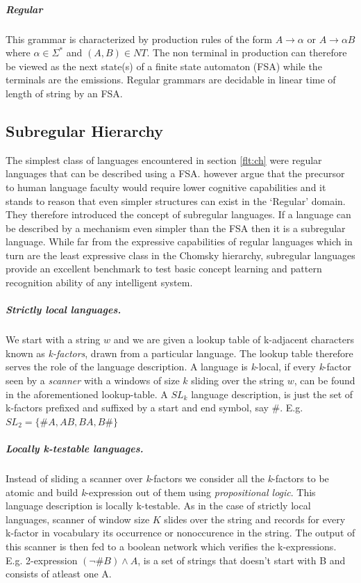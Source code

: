 \subparagraph{Regular} This grammar is characterized by production rules of the form $A \rightarrow \alpha$ or $A \rightarrow \alpha B$ where $\alpha \in \Sigma^{*}$ and $(A, B) \in NT$. The non terminal in production can therefore be viewed as the next state(s) of a finite state automaton (FSA) while the terminals are the emissions. Regular grammars are decidable in linear time of length of string by an FSA.


\subsection{Subregular Hierarchy}\label{flt:sh}
The simplest class of languages encountered in section \ref{flt:ch} were regular languages that can be described using a FSA. \cite{Jager2012} however argue that the precursor to human language faculty would require lower cognitive capabilities and it stands to reason that even simpler structures can exist in the \lq Regular\rq{} domain. They therefore introduced the concept of subregular languages. If a language can be described by a mechanism even simpler than the FSA then it is a subregular language. While far from the expressive capabilities of regular languages which in turn are the least expressive class in the Chomsky hierarchy, subregular languages provide an excellent benchmark to test basic concept learning and pattern recognition ability of any intelligent system.

\subparagraph{Strictly local languages.} We start with a string $w$ and we are given a lookup table of k-adjacent characters known as \textit{k-factors}, drawn from a particular language. The lookup table therefore serves the role of the language description. A language is \textit{k}-local, if every \textit{k}-factor seen by a \textit{scanner} with a windows of size $k$ sliding over the string $w$, can be found in the aforementioned lookup-table. A $SL_k$ language description, is just the set of k-factors prefixed and suffixed by a start and end symbol, say $\#$. E.g. $SL_2 = \{\#A,AB,BA,B\#\}$   

\subparagraph{Locally k-testable languages.} Instead of sliding a scanner over \textit{k}-factors we consider all the \textit{k}-factors to be atomic and build \textit{k}-expression out of them using \textit{propositional logic}. This language description is locally k-testable. As in the case of strictly local languages, scanner of window size $K$ slides over the string and records for every k-factor in vocabulary its occurrence or nonoccurence in the string. The output of this scanner is then fed to a boolean network which verifies the k-expressions. E.g. 2-expression $(\neg \# B) \wedge A$, is a set of strings that doesn't start with B and consists of atleast one A.


